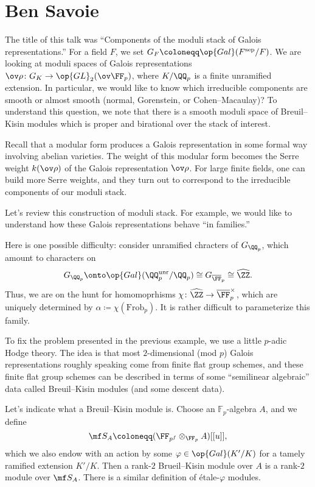 \documentclass{article}
\begin{document}
\section{Ben Savoie}
The title of this talk was ``Components of the moduli stack of Galois representations.'' For a field $F$, we set $G_F\coloneqq\op{Gal}(F^{\mathrm{sep}}/F)$. We are looking at moduli spaces of Galois representations $\ov\rho\colon G_K\to\op{GL}_2(\ov\FF_p)$, where $K/\QQ_p$ is a finite unramified extension. In particular, we would like to know which irreducible components are smooth or almost smooth (normal, Gorenstein, or Cohen--Macaulay)? To understand this question, we note that there is a smooth moduli space of Breuil--Kisin modules which is proper and birational over the stack of interest.

Recall that a modular form produces a Galois representation in some formal way involving abelian varieties. The weight of this modular form becomes the Serre weight $k(\ov\rho)$ of the Galois representation $\ov\rho$. For large finite fields, one can build more Serre weights, and they turn out to correspond to the irreducible components of our moduli stack.

Let's review this construction of moduli stack. For example, we would like to understand how these Galois representations behave ``in families.''
\begin{example}
	Here is one possible difficulty: consider unramified chracters of $G_{\QQ_p}$, which amount to characters on
	\[G_{\QQ_p}\onto\op{Gal}(\QQ_p^{\mathrm{unr}}/\QQ_p)\cong G_{\overline\FF_p}\cong\widehat\ZZ.\]
	Thus, we are on the hunt for homomoprhisms $\chi\colon\widehat\ZZ\to\overline\FF_p^\times$, which are uniquely determined by $\alpha\coloneqq\chi(\mathrm{Frob}_p)$. It is rather difficult to parameterize this family.
\end{example}
To fix the problem presented in the previous example, we use a little $p$-adic Hodge theory. The idea is that most $2$-dimensional (mod $p$) Galois representations roughly speaking come from finite flat group schemes, and these finite flat group schemes can be described in terms of some ``semilinear algebraic'' data called Breuil--Kisin modules (and some descent data).

Let's indicate what a Breuil--Kisin module is. Choose an $\mathbb F_p$-algebra $A$, and we define
\[\mf S_A\coloneqq(\FF_{p^f}\otimes_{\FF_p}A)[[u]],\]
which we also endow with an action by some $\varphi\in\op{Gal}(K'/K)$ for a tamely ramified extension $K'/K$. Then a rank-$2$ Brueil--Kisin module over $A$ is a rank-$2$ module over $\mf S_A$. There is a similar definition of \'etale-$\varphi$ modules.
\end{document}
